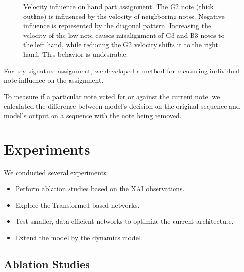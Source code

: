 \documentclass[a4paper, 9pt]{beamer}
\begin{document}
\begin{frame}
\begin{figure}[ht!] \centering  \caption[Velocity influence on hand part assignment.]{Velocity influence on hand part assignment. The G2 note (thick outline) is influenced by the velocity of neighboring notes. Negative influence is represented by the diagonal pattern. Increasing the velocity of the low note causes misalignment of G3 and B3 notes to the left hand, while reducing the G2 velocity shifts it to the right hand. This behavior is undesirable.} \label{hand_part_misalignment} \end{figure}
\end{frame}

\begin{frame}
For key signature assignment, we developed a method for measuring individual note influence on the assignment.\pause

To measure if a particular note voted for or against the current note, we calculated the difference between model's decision on the original sequence and model's output on a sequence with the note being removed. 
\end{frame}

\section{Experiments}

\begin{frame}
We conducted several experiments:\pause
\begin{itemize}
	\item Perform ablation studies based on the XAI observations.\pause
	\item Explore the Transformed-based networks.\pause
	\item Test smaller, data-efficient networks to optimize the current architecture.\pause
	\item Extend the model by the dynamics model. \end{itemize}
\end{frame}

\subsection{Ablation Studies}
\end{document}
